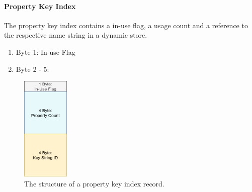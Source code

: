 \documentclass[a4paper,10pt]{article}
\begin{document}
    \paragraph{Property Key Index}
    The property key index contains a in-use flag, a usage count and a reference to the respective name string in a dynamic store.
    \begin{enumerate}
     \item Byte 1: In-use Flag
     \item Byte 2 - 5: 
    \end{enumerate}
        \begin{figure}[htp]\label{prop_key_idx}
        \begin{center}
            \includegraphics[keepaspectratio,height=0.2\textheight,width=0.2\textwidth]{img/03_record/property/property_key_index.png}
        \end{center}
        \caption{The structure of a property key index record.} %
    \end{figure}

    
\end{document}
